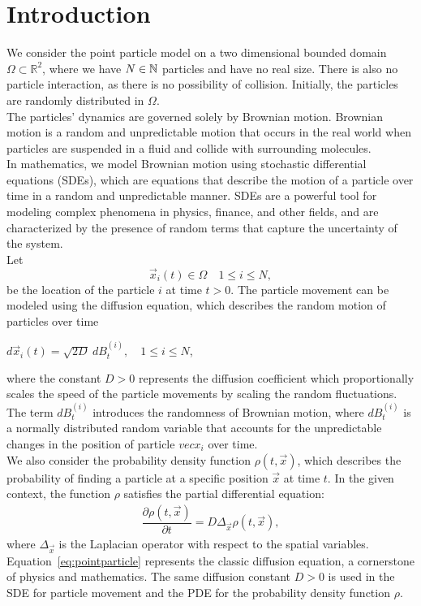 \section{Introduction}
We consider the point particle model on a two dimensional bounded domain $\Omega \subset \mathbb{R}^2$, where we have $N \in \mathbb{N}$ particles and have no real size.
There is also no particle interaction, as there is no possibility of collision. 
Initially, the particles are randomly distributed in $\Omega$. \\
The particles' dynamics are governed solely by Brownian motion.
Brownian motion is a random and unpredictable motion that occurs in the real world when particles are suspended in a fluid and collide with surrounding molecules. \\
In mathematics, we model Brownian motion using stochastic differential equations (SDEs), which are equations that describe the motion of a particle over time in a random and unpredictable manner. 
SDEs are a powerful tool for modeling complex phenomena in physics, finance, and other fields, and are characterized by the presence of random terms that capture the uncertainty of the system. \\
Let 
\[\vec{x}_i(t) \in \Omega \quad 1 \leq i \leq N,\]
be the location of the particle $i$ at time $t > 0$. 
The particle movement can be modeled using the diffusion equation, which describes the random motion of particles over time
\begin{center}
	$d\vec{x}_i(t) = \sqrt{2D} \: dB_t^{(i)}, \quad 1 \leq i \leq N$,
\end{center}
where the constant $D > 0$ represents the diffusion coefficient which proportionally scales the speed of the particle movements by scaling the random fluctuations.
The term $dB_t^{(i)}$ introduces the randomness of Brownian motion, where $dB_t^{(i)}$ is a normally distributed random variable that accounts for the unpredictable changes in the position of particle $vec{x}_i$ over time. \\
We also consider the probability density function $\rho(t, \vec{x})$, which describes the probability of finding a particle at a specific position $\vec{x}$ at time $t$.
In the given context, the function $\rho$ satisfies the partial differential equation:
\begin{align}
	\dfrac{\partial \rho (t, \vec{x})}{\partial t} = D \Delta_{\vec{x}} \rho(t, \vec{x}) \label{eq:pointparticle}, 
\end{align}
where $\Delta_{\vec{x}}$ is the Laplacian operator with respect to the spatial variables. \\
Equation~\eqref{eq:pointparticle} represents the classic diffusion equation, a cornerstone of physics and mathematics.
The same diffusion constant $D>0$ is used in the SDE for particle movement and the PDE for the probability density function $\rho$. \\



